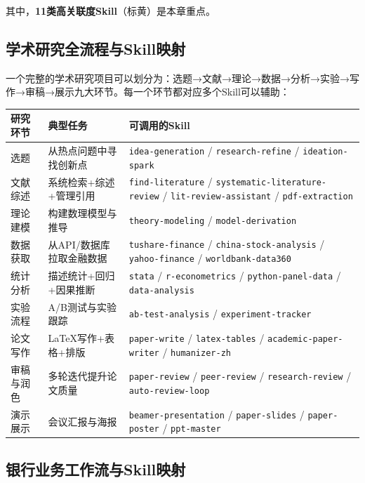 其中，\textbf{11类高关联度Skill}（标黄）是本章重点。

\subsection{学术研究全流程与Skill映射}

一个完整的学术研究项目可以划分为：选题→文献→理论→数据→分析→实验→写作→审稿→展示九大环节。每一个环节都对应多个Skill可以辅助：

\begin{table}[H]
\centering
\begin{tabular}{lp{6cm}p{6cm}}
\toprule
\textbf{研究环节} & \textbf{典型任务} & \textbf{可调用的Skill} \\
\midrule
选题 & 从热点问题中寻找创新点 & \texttt{idea-generation} / \texttt{research-refine} / \texttt{ideation-spark} \\
文献综述 & 系统检索+综述+管理引用 & \texttt{find-literature} / \texttt{systematic-literature-review} / \texttt{lit-review-assistant} / \texttt{pdf-extraction} \\
理论建模 & 构建数理模型与推导 & \texttt{theory-modeling} / \texttt{model-derivation} \\
数据获取 & 从API/数据库拉取金融数据 & \texttt{tushare-finance} / \texttt{china-stock-analysis} / \texttt{yahoo-finance} / \texttt{worldbank-data360} \\
统计分析 & 描述统计+回归+因果推断 & \texttt{stata} / \texttt{r-econometrics} / \texttt{python-panel-data} / \texttt{data-analysis} \\
实验流程 & A/B测试与实验跟踪 & \texttt{ab-test-analysis} / \texttt{experiment-tracker} \\
论文写作 & LaTeX写作+表格+排版 & \texttt{paper-write} / \texttt{latex-tables} / \texttt{academic-paper-writer} / \texttt{humanizer-zh} \\
审稿与润色 & 多轮迭代提升论文质量 & \texttt{paper-review} / \texttt{peer-review} / \texttt{research-review} / \texttt{auto-review-loop} \\
演示展示 & 会议汇报与海报 & \texttt{beamer-presentation} / \texttt{paper-slides} / \texttt{paper-poster} / \texttt{ppt-master} \\
\bottomrule
\end{tabular}
\end{table}

\subsection{银行业务工作流与Skill映射}

